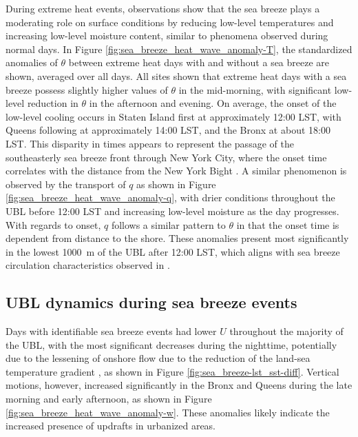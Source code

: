 \documentclass[num-refs]{wiley-article}
\begin{document}
During extreme heat events, observations show that the sea breeze plays a moderating role on surface conditions by reducing low-level temperatures and increasing low-level moisture content, similar to phenomena observed during normal days. In Figure \ref{fig:sea_breeze_heat_wave_anomaly-T}, the standardized anomalies of $\theta$ between extreme heat days with and without a sea breeze are shown, averaged over all days. All sites shown that extreme heat days with a sea breeze possess slightly higher values of $\theta$ in the mid-morning, with significant low-level reduction in $\theta$ in the afternoon and evening. On average, the onset of the low-level cooling occurs in Staten Island first at approximately 12:00 LST, with Queens following at approximately 14:00 LST, and the Bronx at about 18:00 LST. This disparity in times appears to represent the passage of the southeasterly sea breeze front through New York City, where the onset time correlates with the distance from the New York Bight \citep{bornstein1981}. A similar phenomenon is observed by the transport of $q$ as shown in Figure \ref{fig:sea_breeze_heat_wave_anomaly-q}, with drier conditions throughout the UBL before 12:00 LST and increasing low-level moisture as the day progresses. With regards to onset, $q$ follows a similar pattern to $\theta$ in that the onset time is dependent from distance to the shore. These anomalies present most significantly in the lowest \SI{1000}{\meter} of the UBL after 12:00 LST, which aligns with sea breeze circulation characteristics observed in \citet{frizzola1963}.

\subsection{UBL dynamics during sea breeze events}
Days with identifiable sea breeze events had lower $U$ throughout the majority of the UBL, with the most significant decreases during the nighttime, potentially due to the lessening of onshore flow due to the reduction of the land-sea temperature gradient \citep{pullen2007}, as shown in Figure \ref{fig:sea_breeze-lst_sst-diff}. Vertical motions, however, increased significantly in the Bronx and Queens during the late morning and early afternoon, as shown in Figure \ref{fig:sea_breeze_heat_wave_anomaly-w}. These anomalies likely indicate the increased presence of updrafts in urbanized areas.
\end{document}
